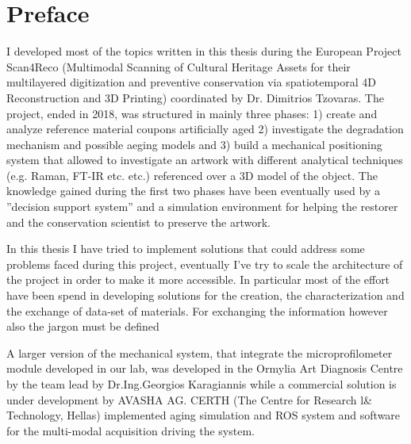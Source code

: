 \chapter*{Preface}
I developed most of the topics written in this thesis during the European Project Scan4Reco (Multimodal Scanning of Cultural Heritage Assets for their multilayered digitization and preventive conservation via spatiotemporal 4D Reconstruction and 3D Printing) coordinated by Dr. Dimitrios Tzovaras. The project, ended in 2018, was structured in mainly three phases: 1) create and analyze reference material coupons artificially aged 2) investigate the degradation mechanism and possible aeging models and 3) build a mechanical positioning system that allowed to investigate an artwork with different analytical techniques (e.g. Raman, FT-IR etc. etc.) referenced over a 3D model of the object. The knowledge gained during the first two phases have been eventually used by a ''decision support system'' and a simulation environment for helping the restorer and the conservation scientist to preserve the artwork. \par In this thesis I have tried to implement solutions that could address some problems faced during this project, eventually I've try to scale the architecture of the project in order to make it more accessible. In particular most of the effort have been spend in developing solutions for the creation, the characterization and the exchange of data-set of materials. %
For exchanging the information however also the jargon must be defined 

A larger version of the mechanical system, that integrate the microprofilometer module developed in our lab, was developed in the Ormylia Art Diagnosis Centre by the team lead by Dr.Ing.Georgios Karagiannis while a commercial solution is under development by AVASHA AG. CERTH (The Centre for Research l\& Technology, Hellas) implemented aging simulation and ROS system and software for the multi-modal acquisition driving the system. 
